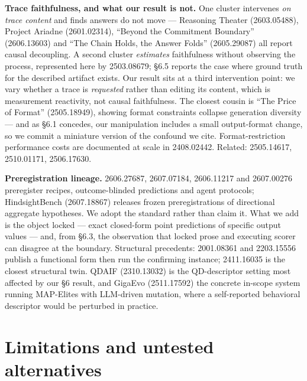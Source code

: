 \documentclass[11pt]{article}
\begin{document}
\textbf{Trace faithfulness, and what our result is not.} One cluster intervenes \textit{on trace content}
and finds answers do not move --- Reasoning Theater (2603.05488), Project Ariadne (2601.02314),
``Beyond the Commitment Boundary'' (2606.13603) and ``The Chain Holds, the Answer Folds''
(2605.29087) all report causal decoupling. A second cluster \textit{estimates} faithfulness without
observing the process, represented here by 2503.08679; \S6.5 reports the case where ground truth
for the described artifact exists. Our result sits at a third intervention point: we vary
whether a trace is \textit{requested} rather than editing its content, which is measurement reactivity,
not causal faithfulness. The closest cousin is ``The Price of Format'' (2505.18949), showing
format constraints collapse generation diversity --- and as \S6.1 concedes, our manipulation
includes a small output-format change, so we commit a miniature version of the confound we cite.
Format-restriction performance costs are documented at scale in 2408.02442. Related:
2505.14617, 2510.01171, 2506.17630.

\textbf{Preregistration lineage.} 2606.27687, 2607.07184, 2606.11217 and 2607.00276 preregister
recipes, outcome-blinded predictions and agent protocols; HindsightBench (2607.18867) releases
frozen preregistrations of directional aggregate hypotheses. We adopt the standard rather than
claim it. What we add is the object locked --- exact closed-form point predictions of specific
output values --- and, from \S6.3, the observation that locked prose and executing scorer can
disagree at the boundary. Structural precedents: 2001.08361 and 2203.15556 publish a functional
form then run the confirming instance; 2411.16035 is the closest structural twin. QDAIF
(2310.13032) is the QD-descriptor setting most affected by our \S6 result, and GigaEvo
(2511.17592) the concrete in-scope system running MAP-Elites with LLM-driven mutation, where a
self-reported behavioral descriptor would be perturbed in practice.

\section{Limitations and untested alternatives}
\end{document}
